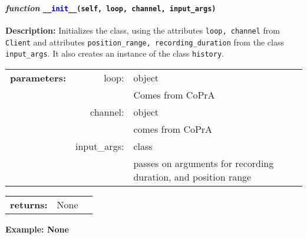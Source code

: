 

\paragraph{\textit{function} \textcolor{blue}{\texttt{\_\_init\_\_}}\texttt{(self, loop, channel, input\_args)}}\hfill\break
\noindent \textbf{Description:} Initializes the class, using the attributes \texttt{loop, channel} from \texttt{Client} and attributes \texttt{position\_range, recording\_duration} from the class \texttt{input\_args}. It also creates an instance of the class \texttt{history}. 

\begin{tabular}{c r l }
	\textbf{parameters:}	& loop: & object\\
	&  & Comes from CoPrA\\
	&channel:& object\\
	&&comes from CoPrA\\
	&input\_args:& class\\
	&& passes on arguments for recording duration, and position range	
\end{tabular}

\begin{tabular}{l c l}
	\textbf{returns:} & None & \\
\end{tabular}

\textbf{Example: None}
%	 	
